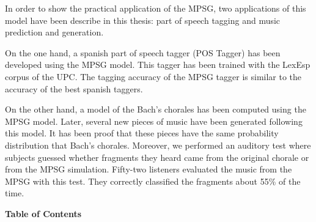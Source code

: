 \documentclass[final]{beatcs}
\begin{document}
 In order to show the practical application of the MPSG, two
 applications of this model have been describe in this thesis: part of
 speech tagging and music prediction and generation.


 On the one hand, a spanish part of speech tagger (POS Tagger) has
 been developed using the MPSG model. This tagger has been trained
 with the LexEsp corpus of the UPC. The tagging accuracy of the MPSG
 tagger is similar to the accuracy of the best spanish taggers.

 On the other hand, a model of the Bach's chorales has been computed
 using the MPSG model. Later, several new pieces of music have been
 generated following this model. It has been proof that these pieces
 have the same probability distribution that Bach's chorales.
 Moreover, we performed an auditory test where subjects guessed
 whether fragments they heard came from the original chorale or from
 the MPSG simulation. Fifty-two listeners evaluated the music from the
 MPSG with this test. They correctly classified the fragments about
 55\% of the time.

\begin{center}
\textbf{Table of Contents}
\end{center}
\end{document}
